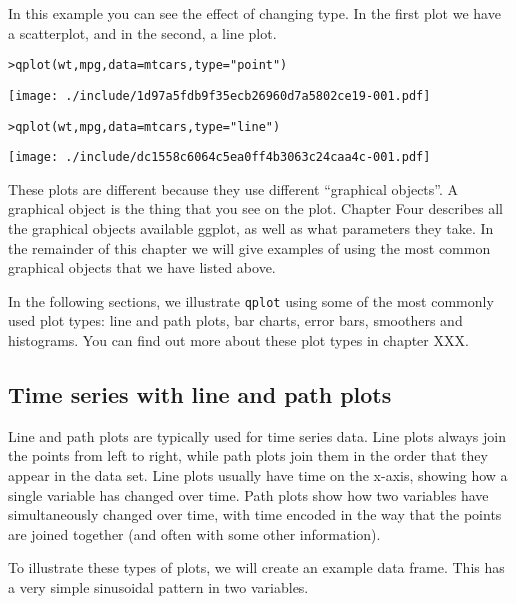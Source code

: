 In this example you can see the effect of changing type.  In the first plot we have a scatterplot, and in the second, a line plot.

\begin{alltt}
> qplot(wt, mpg, data = mtcars, type = "point")
\end{alltt}
\texttt{[image: ./include/1d97a5fdb9f35ecb26960d7a5802ce19-001.pdf]}
\begin{alltt}

> qplot(wt, mpg, data = mtcars, type = "line")
\end{alltt}
\texttt{[image: ./include/dc1558c6064c5ea0ff4b3063c24caa4c-001.pdf]}
\begin{alltt}

\end{alltt}


These plots are different because they use different ``graphical objects''.  A graphical object is the thing that you see on the plot.  Chapter Four describes all the graphical objects available ggplot, as well as what parameters they take.  In the remainder of this chapter we will give examples of using the most common graphical objects that we have listed above.

In the following sections, we illustrate {\tt qplot} using some of the most commonly used plot types: line and path plots, bar charts, error bars, smoothers and histograms.  You can find out more about these plot types in chapter XXX.

\subsection{Time series with line and path plots}\label{sub:line_plot}

Line and path plots are typically used for time series data.  Line plots always join the points from left to right, while path plots join them in the order that they appear in the data set.  Line plots usually have time on the x-axis, showing how a single variable has changed over time.  Path plots show how two variables have simultaneously changed over time, with time encoded in the way that the points are joined together (and often with some other information).

To illustrate these types of plots, we will create an example data frame.  This has a very simple sinusoidal pattern in two variables.

